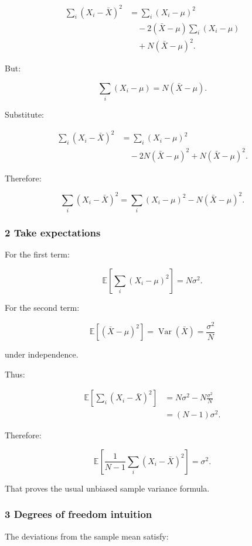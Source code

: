 \[
 \begin{aligned} \sum_i(X_i-\bar X)^2 &= \sum_i(X_i-\mu)^2\\ &\quad-2(\bar X-\mu)\sum_i(X_i-\mu)\\ &\quad+N(\bar X-\mu)^2. \end{aligned}
\]

But:

\[
 \sum_i(X_i-\mu)=N(\bar X-\mu).
\]

Substitute:

\[
 \begin{aligned} \sum_i(X_i-\bar X)^2 &= \sum_i(X_i-\mu)^2\\ &\quad-2N(\bar X-\mu)^2 +N(\bar X-\mu)^2. \end{aligned}
\]

Therefore:

\[
 \boxed{ \sum_i(X_i-\bar X)^2 = \sum_i(X_i-\mu)^2 - N(\bar X-\mu)^2 }.
\]

\subsubsection{2 Take expectations}\label{02-foundations-ii-ch030-take-expectations}

For the first term:

\[
 \mathbb E\left[ \sum_i(X_i-\mu)^2 \right] =N\sigma^2.
\]

For the second term:

\[
 \mathbb E[(\bar X-\mu)^2] = \operatorname{Var}(\bar X) = \frac{\sigma^2}{N}
\]

under independence.

Thus:

\[
 \begin{aligned} \mathbb E\left[ \sum_i(X_i-\bar X)^2 \right] &= N\sigma^2- N\frac{\sigma^2}{N}\\ &=(N-1)\sigma^2. \end{aligned}
\]

Therefore:

\[
 \boxed{ \mathbb E\left[ \frac1{N-1} \sum_i(X_i-\bar X)^2 \right] = \sigma^2 }.
\]

That proves the usual unbiased sample variance formula.

\subsubsection{3 Degrees of freedom intuition}\label{02-foundations-ii-ch030-degrees-of-freedom-intuition}

The deviations from the sample mean satisfy:

